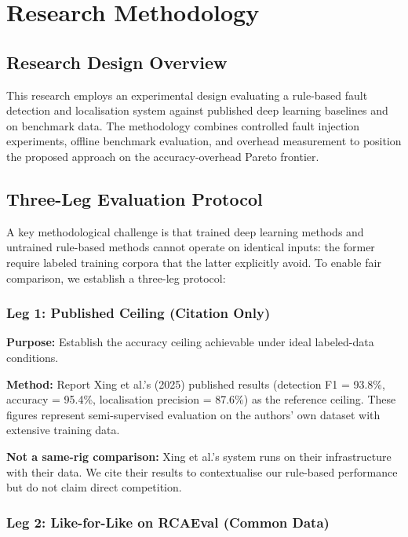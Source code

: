 \chapter{Research Methodology}

\section{Research Design Overview}

This research employs an experimental design evaluating a rule-based fault detection and localisation system against published deep learning baselines and on benchmark data. The methodology combines controlled fault injection experiments, offline benchmark evaluation, and overhead measurement to position the proposed approach on the accuracy-overhead Pareto frontier.

\section{Three-Leg Evaluation Protocol}

A key methodological challenge is that trained deep learning methods and untrained rule-based methods cannot operate on identical inputs: the former require labeled training corpora that the latter explicitly avoid. To enable fair comparison, we establish a three-leg protocol:

\subsection{Leg 1: Published Ceiling (Citation Only)}

\textbf{Purpose:} Establish the accuracy ceiling achievable under ideal labeled-data conditions.

\textbf{Method:} Report Xing et al.'s (2025) published results (detection F1 = 93.8\%, accuracy = 95.4\%, localisation precision = 87.6\%) as the reference ceiling. These figures represent semi-supervised evaluation on the authors' own dataset with extensive training data.

\textbf{Not a same-rig comparison:} Xing et al.'s system runs on their infrastructure with their data. We cite their results to contextualise our rule-based performance but do not claim direct competition.

\subsection{Leg 2: Like-for-Like on RCAEval (Common Data)}

